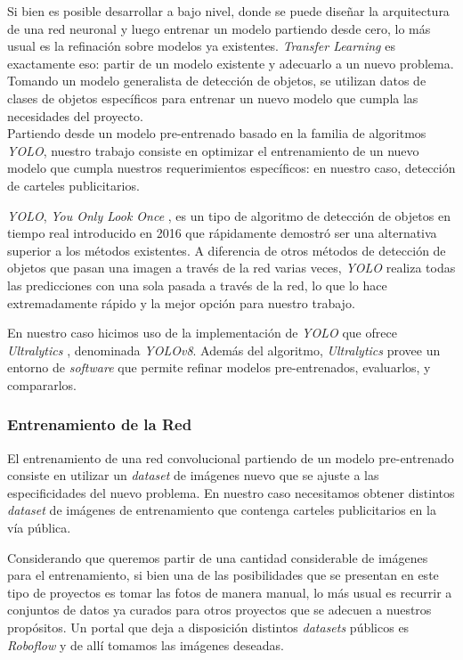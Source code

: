 \documentclass[a4paper]{article}
\begin{document}
Si bien es posible desarrollar a bajo nivel, donde se puede diseñar la arquitectura de una red neuronal y luego entrenar un modelo partiendo desde cero, lo más usual es la refinación sobre modelos ya existentes. \textit{Transfer Learning} es exactamente eso: partir de un modelo existente y adecuarlo a un nuevo problema. Tomando un modelo generalista de detección de objetos, se utilizan datos de clases de objetos específicos para entrenar un nuevo modelo que cumpla las necesidades del proyecto.\\

Partiendo desde un modelo pre-entrenado basado en la familia de algoritmos \textit{YOLO}, nuestro trabajo consiste en optimizar el entrenamiento de un nuevo modelo que cumpla nuestros requerimientos específicos: en nuestro caso, detección de carteles publicitarios.

\textit{YOLO}, \textit{You Only Look Once} \cite{yolov1}, es un tipo de algoritmo de detección de objetos en tiempo real introducido en 2016 que rápidamente demostró ser una alternativa superior a los métodos existentes. A diferencia de otros métodos de detección de objetos que pasan una imagen a través de la red varias veces, \textit{YOLO} realiza todas las predicciones con una sola pasada a través de la red, lo que lo hace extremadamente rápido y la mejor opción para nuestro trabajo.

En nuestro caso hicimos uso de la implementación de \textit{YOLO} que ofrece \textit{Ultralytics} \cite{ultralytics}, denominada \textit{YOLOv8}. Además del algoritmo, \textit{Ultralytics} provee un entorno de \textit{software} que permite refinar modelos pre-entrenados, evaluarlos, y compararlos.

\subsubsection{Entrenamiento de la Red}

El entrenamiento de una red convolucional partiendo de un modelo pre-entrenado consiste en utilizar un \textit{dataset} de imágenes nuevo que se ajuste a las especificidades del nuevo problema. En nuestro caso necesitamos obtener distintos \textit{dataset} de imágenes de entrenamiento que contenga carteles publicitarios en la vía pública.

Considerando que queremos partir de una cantidad considerable de imágenes para el entrenamiento, si bien una de las posibilidades que se presentan en este tipo de proyectos es tomar las fotos de manera manual, lo más usual es recurrir a conjuntos de datos ya curados para otros proyectos que se adecuen a nuestros propósitos. Un portal que deja a disposición distintos \textit{datasets} públicos es \textit{Roboflow} \cite{roboflow} y de allí tomamos las imágenes deseadas.\\
\end{document}
